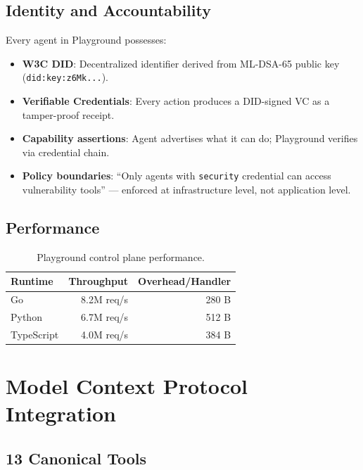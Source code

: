 \documentclass[11pt,letterpaper]{article}
\begin{document}
\subsection{Identity and Accountability}

Every agent in Playground possesses:

\begin{itemize}
\item \textbf{W3C DID}: Decentralized identifier derived from ML-DSA-65 public key (\texttt{did:key:z6Mk...}).
\item \textbf{Verifiable Credentials}: Every action produces a DID-signed VC as a tamper-proof receipt.
\item \textbf{Capability assertions}: Agent advertises what it can do; Playground verifies via credential chain.
\item \textbf{Policy boundaries}: ``Only agents with \texttt{security} credential can access vulnerability tools'' --- enforced at infrastructure level, not application level.
\end{itemize}

\subsection{Performance}

\begin{table}[H]
\centering
\begin{tabular}{@{}lrr@{}}
\toprule
\textbf{Runtime} & \textbf{Throughput} & \textbf{Overhead/Handler} \\
\midrule
Go & 8.2M req/s & 280 B \\
Python & 6.7M req/s & 512 B \\
TypeScript & 4.0M req/s & 384 B \\
\bottomrule
\end{tabular}
\caption{Playground control plane performance.}
\label{tab:playground-perf}
\end{table}

\section{Model Context Protocol Integration}

\subsection{13 Canonical Tools}
\end{document}
